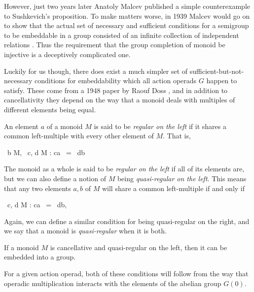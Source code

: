 \documentclass{amsbook} %
\newenvironment{eq*}{\begin{equation*}}{\end{equation*}}
\numberwithin{section}{chapter}
\begin{document}
However, just two years later Anatoly Malcev published a simple counterexample \cite{malcev-immer1} to Sushkevich's proposition. To make matters worse, in 1939 Malcev would go on to show that the actual set of necessary and sufficient conditions for a semigroup to be embeddable in a group consisted of an infinite collection of independent relations \cite{malcev-immer2}. Thus the requirement that the group completion of monoid be injective is a deceptively complicated one. 

Luckily for us though, there does exist a much simpler set of sufficient-but-not-necessary conditions for embeddability which all action operads $G$ happen to satisfy. These come from a 1948 paper by Raouf Doss \cite{doss-imm}, and in addition to cancellativity they depend on the way that a monoid deals with multiples of different elements being equal.

\begin{Defi} An element $a$ of a monoid $M$ is said to be \emph{regular on the left} if it shares a common left-multiple with every other element of $M$. That is,
\begin{eq*} \forall \, b \in M, \quad \exists \, c, d \in M \quad : \quad ca \, = \, db \end{eq*}
The monoid as a whole is said to be \emph{regular on the left} if all of its elements are, but we can also define a notion of $M$ being \emph{quasi-regular on the left}. This means that any two elements $a,b$ of $M$ will share a common left-multiple if and only if
\begin{eq*} \exists \, c, d \in M \quad : \quad ca \, = \, db, \quad \quad {} \end{eq*}
Again, we can define a similar condition for being quasi-regular on the right, and we say that a monoid is \emph{quasi-regular} when it is both.
\end{Defi}

\begin{prop} If a monoid $M$ is cancellative and quasi-regular on the left, then it can be embedded into a group.
\end{prop}

For a given action operad, both of these conditions will follow from the way that operadic multiplication interacts with the elements of the abelian group $G(0)$.
\end{document}
